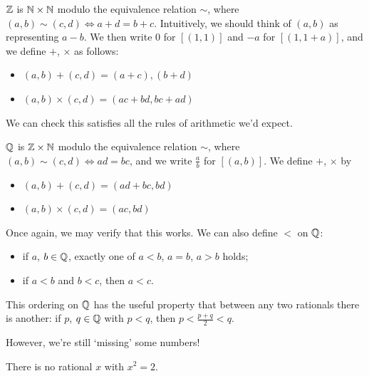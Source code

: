 \documentclass{../../template/note}
\begin{document}
    \begin{definition}
        \(\mathbb Z\) is \(\mathbb N \times \mathbb N\) modulo the equivalence relation \(\sim\), where \((a, b) \sim (c, d) \iff a + d = b + c\). Intuitively, we should think of \((a, b)\) as representing \(a - b\). We then write 0 for \([(1, 1)]\) and \(-a\) for \([(1, 1 + a)]\), and we define \(+\), \(\times\) as follows:
        \begin{itemize}
            \item \((a, b) + (c, d) = (a + c), (b + d)\)
            \item \((a, b) \times (c, d) = (ac + bd, bc + ad)\)
        \end{itemize}
        We can check this satisfies all the rules of arithmetic we'd expect.
    \end{definition}

    \begin{definition}
        \(\mathbb Q\) is \(\mathbb Z \times \mathbb N\) modulo the equivalence relation \(\sim\), where \((a, b) \sim (c, d) \iff ad = bc\), and we write \(\frac{a}{b}\) for \([(a, b)]\). We define \(+\), \(\times\) by
        \begin{itemize}
            \item \((a, b) + (c, d) = (ad + bc, bd)\)
            \item \((a, b) \times (c, d) = (ac, bd)\)
        \end{itemize}
        Once again, we may verify that this works. We can also define \(<\) on \(\mathbb Q\):
        \begin{itemize}
            \item if \(a\), \(b \in \mathbb Q\), exactly one of \(a < b\), \(a = b\), \(a > b\) holds;
            \item if \(a < b\) and \(b < c\), then \(a < c\).
        \end{itemize}
        
                
    \end{definition}
    
    
    
    


    This ordering on \(\mathbb Q\) has the useful property that between any two rationals there is another: if \(p\), \(q \in \mathbb Q\) with \(p < q\), then \(p < \frac{p+q}{2} < q\).

    However, we're still `missing' some numbers!

    \begin{proposition}
        There is no rational \(x\) with \(x^2 = 2\).
    \end{proposition}
    
\end{document}
